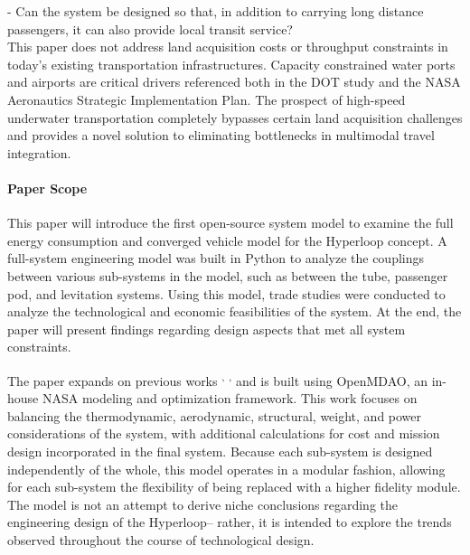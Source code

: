 	- Can the system be designed so that, in addition to carrying long distance
	passengers, it can also provide local transit service?\\

	This paper does not address land acquisition costs or throughput
	constraints in today's existing transportation infrastructures.
	Capacity constrained water ports and airports are critical drivers referenced
	both in the DOT study and the NASA Aeronautics Strategic
	Implementation Plan. The prospect of high-speed underwater transportation
	completely bypasses certain land acquisition challenges and provides a novel solution
	to eliminating bottlenecks in multimodal travel integration.\\

\paragraph{Paper Scope}
	This paper will introduce the first open-source system model to examine the
	full energy consumption and converged vehicle model for the Hyperloop concept.
	A full-system engineering model was built in Python to analyze the couplings
	between various sub-systems in the model, such as between the tube, passenger pod, and
	levitation systems. Using this model, trade studies were conducted to analyze the technological
	and economic feasibilities of the system.
	At the end, the paper will present findings regarding design aspects that
	met all system constraints.

	The paper expands on previous works \cite{Chin} \textsuperscript{,}
	\cite{goodwin2009cantera}\textsuperscript{,} \cite{GrayBenchmarking2013}
	and is built using OpenMDAO, an in-house NASA modeling and optimization framework.
	This work focuses on balancing the thermodynamic, aerodynamic, structural,
	weight, and power considerations of the system, with additional calculations for cost
	and mission design incorporated in the final system. Because each sub-system
	is designed independently of the whole, this model operates in a modular fashion, allowing
	for each sub-system the flexibility of being replaced with a higher fidelity module.
	The model is not an attempt to derive niche conclusions regarding the
	engineering design of the Hyperloop-- rather, it is intended to explore
	the trends observed throughout the course of technological design.

